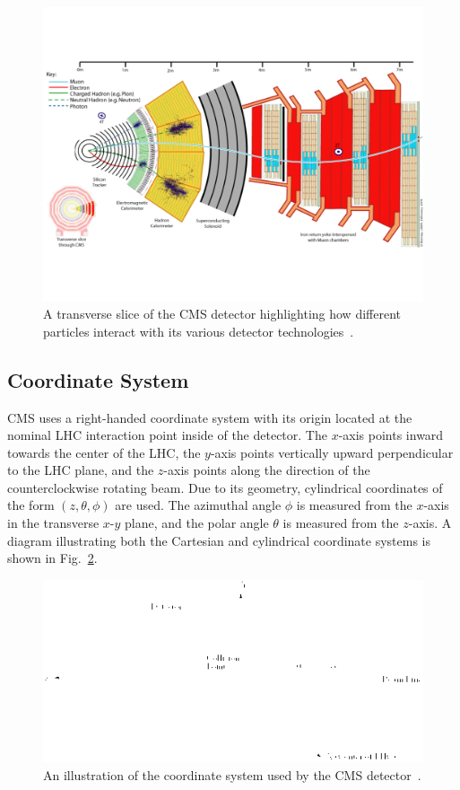 \begin{figure}[!htbp]
	\centering
	\includegraphics[width=1.0\textwidth]{figures/CMS_slice.pdf}
	\caption{A transverse slice of the CMS detector highlighting how different particles interact with its various detector technologies~\cite{Davis:2205172}.}
	\label{cms-slice}
\end{figure}


\subsection{Coordinate System}

CMS uses a right-handed coordinate system with its origin located at the nominal LHC interaction point inside of the detector. The $x$-axis points inward towards the center of the LHC, the $y$-axis points vertically upward perpendicular to the LHC plane, and the $z$-axis points along the direction of the counterclockwise rotating beam. Due to its geometry, cylindrical coordinates of the form $(z,\theta,\phi)$ are used. The azimuthal angle $\phi$ is measured from the $x$-axis in the transverse $x$-$y$ plane, and the polar angle $\theta$ is measured from the $z$-axis. A diagram illustrating both the Cartesian and cylindrical coordinate systems is shown in Fig.~\ref{fig:coordinate_system}. 

\begin{figure}[!htb]
	\centering
	\includegraphics[scale=0.75]{figures/coordinate_system.png}
	\caption{An illustration of the coordinate system used by the CMS detector~\cite{Schott:1699952}.}
	\label{fig:coordinate_system}
\end{figure}

